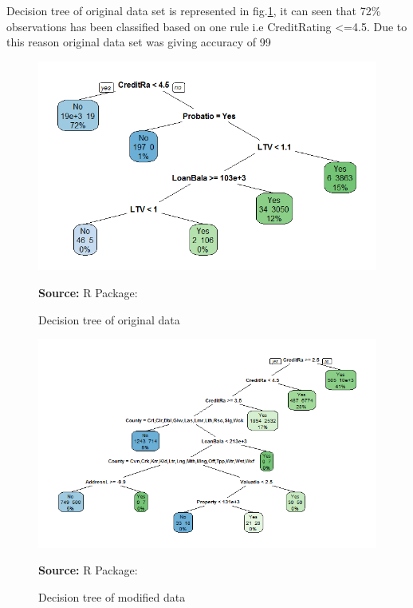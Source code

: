 Decision tree of original data set is represented in fig.\ref{fig:DTorg}, it can seen that 72\% observations has been classified based on one rule i.e CreditRating <=4.5. Due to this reason original data set was giving accuracy of 99%

\begin{center}
\begin{figure}[!htb]
\includegraphics[width=\textwidth]{DTorg.png}
\centering
\caption{Decision tree of original data}{\textbf{Source:} R Package:\citep{rpart.plotpackage}}
\label{fig:DTorg}
\end{figure}
\end{center}

\begin{center}
\begin{figure}[!htb]
\includegraphics[width=\textwidth]{DTmod.png}
\centering
\caption{Decision tree of modified data}{\textbf{Source:} R Package: \citep{rpart.plotpackage}}
\label{fig:DTmod}
\end{figure}
\end{center}

